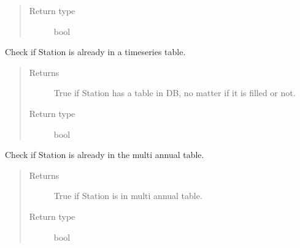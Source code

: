 \documentclass[letterpaper,10pt,english]{sphinxmanual}
\begin{document}
\begin{fulllineitems}
\begin{fulllineitems}
\begin{quote}
\begin{description}
\item[{Return type}] \leavevmode
\sphinxAtStartPar
bool

\end{description}\end{quote}

\end{fulllineitems}


\begin{fulllineitems}
\label{\detokenize{weatherDB:weatherDB.station.StationBase.isin_db}}
\sphinxAtStartPar
Check if Station is already in a timeseries table.
\begin{quote}\begin{description}
\item[{Returns}] \leavevmode
\sphinxAtStartPar
True if Station has a table in DB, no matter if it is filled or not.

\item[{Return type}] \leavevmode
\sphinxAtStartPar
bool

\end{description}\end{quote}

\end{fulllineitems}


\begin{fulllineitems}
\label{\detokenize{weatherDB:weatherDB.station.StationBase.isin_ma}}
\sphinxAtStartPar
Check if Station is already in the multi annual table.
\begin{quote}\begin{description}
\item[{Returns}] \leavevmode
\sphinxAtStartPar
True if Station is in multi annual table.

\item[{Return type}] \leavevmode
\sphinxAtStartPar
bool

\end{description}\end{quote}

\end{fulllineitems}


\end{fulllineitems}
\end{document}
